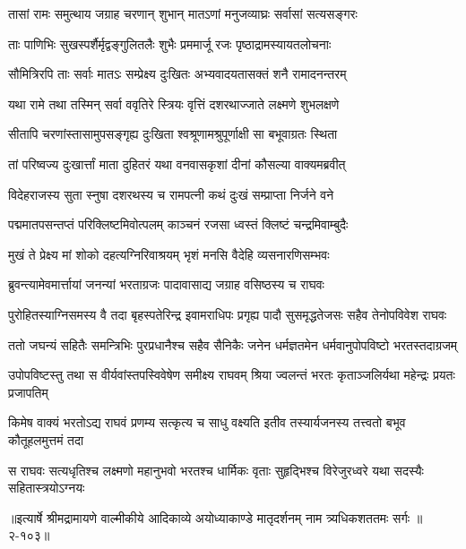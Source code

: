 \twolineshloka
{तासां रामः समुत्थाय जग्राह चरणान् शुभान्}
{मातऽणां मनुजव्याघ्रः सर्वासां सत्यसङ्गरः} %

\twolineshloka
{ताः पाणिभिः सुखस्पर्शैर्मृद्वङ्गुलितलैः शुभैः}
{प्रममार्जू रजः पृष्ठाद्रामस्यायतलोचनाः} %

\twolineshloka
{सौमित्रिरपि ताः सर्वाः मातऽः सम्प्रेक्ष्य दुःखितः}
{अभ्यवादयतासक्तं शनै रामादनन्तरम्} %

\twolineshloka
{यथा रामे तथा तस्मिन् सर्वा ववृतिरे स्त्रियः}
{वृत्तिं दशरथाज्जाते लक्ष्मणे शुभलक्षणे} %

\twolineshloka
{सीतापि चरणांस्तासामुपसङ्गृह्य दुःखिता}
{श्वश्रूणामश्रुपूर्णाक्षी सा बभूवाग्रतः स्थिता} %

\twolineshloka
{तां परिष्वज्य दुःखार्त्तां माता दुहितरं यथा}
{वनवासकृशां दीनां कौसल्या वाक्यमब्रवीत्} %

\twolineshloka
{विदेहराजस्य सुता स्नुषा दशरथस्य च}
{रामपत्नी कथं दुःखं सम्प्राप्ता निर्जने वने} %

\twolineshloka
{पद्ममातपसन्तप्तं परिक्लिष्टमिवोत्पलम्}
{काञ्चनं रजसा ध्वस्तं क्लिष्टं चन्द्रमिवाम्बुदैः} %

\onelineshloka
{मुखं ते प्रेक्ष्य मां शोको दहत्यग्निरिवाश्रयम् भृशं मनसि वैदेहि व्यसनारणिसम्भवः} %

\twolineshloka
{ब्रुवन्त्यामेवमार्त्तायां जनन्यां भरताग्रजः}
{पादावासाद्य जग्राह वसिष्ठस्य च राघवः} %

\twolineshloka
{पुरोहितस्याग्निसमस्य वै तदा बृहस्पतेरिन्द्र इवामराधिपः}
{प्रगृह्य पादौ सुसमृद्धतेजसः सहैव तेनोपविवेश राघवः} %

\twolineshloka
{ततो जघन्यं सहितैः समन्त्रिभिः पुरप्रधानैश्च सहैव सैनिकैः}
{जनेन धर्मज्ञतमेन धर्मवानुपोपविष्टो भरतस्तदाग्रजम्} %

\twolineshloka
{उपोपविष्टस्तु तथा स वीर्यवांस्तपस्विवेषेण समीक्ष्य राघवम्}
{श्रिया ज्वलन्तं भरतः कृताञ्जलिर्यथा महेन्द्रः प्रयतः प्रजापतिम्} %

\twolineshloka
{किमेष वाक्यं भरतोऽद्य राघवं प्रणम्य सत्कृत्य च साधु वक्ष्यति}
{इतीव तस्यार्यजनस्य तत्त्वतो बभूव कौतूहलमुत्तमं तदा} %

\twolineshloka
{स राघवः सत्यधृतिश्च लक्ष्मणो महानुभवो भरतश्च धार्मिकः}
{वृताः सुहृद्भिश्च विरेजुरध्वरे यथा सदस्यैः सहितास्त्रयोऽग्नयः} %


॥इत्यार्षे श्रीमद्रामायणे वाल्मीकीये आदिकाव्ये अयोध्याकाण्डे मातृदर्शनम् नाम त्र्यधिकशततमः सर्गः ॥२-१०३॥
